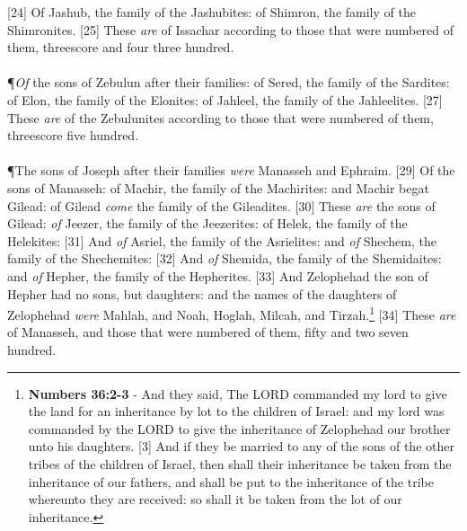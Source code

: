 [24] \textcolor[cmyk]{0.99998,1,0,0}{Of Jashub, the family of the Jashubites: of Shimron, the family of the Shimronites.}
[25] \textcolor[cmyk]{0.99998,1,0,0}{These \emph{are}  of Issachar according to those that were numbered of them, threescore and four  three hundred.}\\
\\
\P \textcolor[cmyk]{0.99998,1,0,0}{\emph{Of} the sons of Zebulun after their families: of Sered, the family of the Sardites: of Elon, the family of the Elonites: of Jahleel, the family of the Jahleelites.}
[27] \textcolor[cmyk]{0.99998,1,0,0}{These \emph{are}  of the Zebulunites according to those that were numbered of them, threescore  five hundred.}\\
\\
\P \textcolor[cmyk]{0.99998,1,0,0}{The sons of Joseph after their families \emph{were} Manasseh and Ephraim.}
[29] \textcolor[cmyk]{0.99998,1,0,0}{Of the sons of Manasseh: of Machir, the family of the Machirites: and Machir begat Gilead: of Gilead \emph{come} the family of the Gileadites.}
[30] \textcolor[cmyk]{0.99998,1,0,0}{These \emph{are} the sons of Gilead: \emph{of} Jeezer, the family of the Jeezerites: of Helek, the family of the Helekites:}
[31] \textcolor[cmyk]{0.99998,1,0,0}{And \emph{of} Asriel, the family of the Asrielites: and \emph{of} Shechem, the family of the Shechemites:}
[32] \textcolor[cmyk]{0.99998,1,0,0}{And \emph{of} Shemida, the family of the Shemidaites: and \emph{of} Hepher, the family of the Hepherites.}
[33] \textcolor[cmyk]{0.99998,1,0,0}{And Zelophehad the son of Hepher had no sons, but daughters: and the names of the daughters of Zelophehad \emph{were} Mahlah, and Noah, Hoglah, Milcah, and Tirzah.}\footnote{\textbf{Numbers 36:2-3} - And they said, The LORD commanded my lord to give the land for an inheritance by lot to the children of Israel: and my lord was commanded by the LORD to give the inheritance of Zelophehad our brother unto his daughters. [3] And if they be married to any of the sons of the other tribes of the children of Israel, then shall their inheritance be taken from the inheritance of our fathers, and shall be put to the inheritance of the tribe whereunto they are received: so shall it be taken from the lot of our inheritance.}
[34] \textcolor[cmyk]{0.99998,1,0,0}{These \emph{are}  of Manasseh, and those that were numbered of them, fifty and two  seven hundred.}\\
